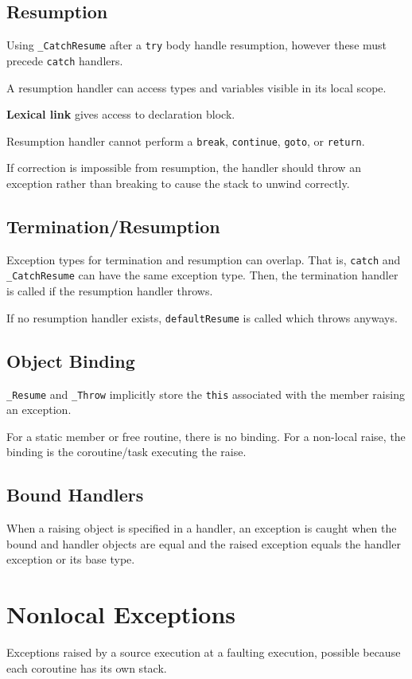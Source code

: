 \documentclass[11pt]{article}
\begin{document}
\subsection{Resumption}
\label{sec:org9e1e2b3}
Using \texttt{\_CatchResume} after a \texttt{try} body handle resumption, however these must precede \texttt{catch} handlers.

A resumption handler can access types and variables visible in its local scope.

\textbf{Lexical link} gives access to declaration block.

Resumption handler cannot perform a \texttt{break}, \texttt{continue}, \texttt{goto}, or \texttt{return}.

If correction is impossible from resumption, the handler should throw an exception rather than
breaking to cause the stack to unwind correctly.
\subsection{Termination/Resumption}
\label{sec:org0ec686c}
Exception types for termination and resumption can overlap.
That is, \texttt{catch} and \texttt{\_CatchResume} can have the same exception type.
Then, the termination handler is called if the resumption handler throws.

If no resumption handler exists, \texttt{defaultResume} is called which throws anyways.
\subsection{Object Binding}
\label{sec:org985291a}
\texttt{\_Resume} and \texttt{\_Throw} implicitly store the \texttt{this} associated with the member raising an exception.

For a static member or free routine, there is no binding.
For a non-local raise, the binding is the coroutine/task executing the raise.
\subsection{Bound Handlers}
\label{sec:org62822b0}
When a raising object is specified in a handler, an exception is caught when the bound and handler
objects are equal and the raised exception equals the handler exception or its base type.
\section{Nonlocal Exceptions}
\label{sec:org38719ca}
Exceptions raised by a source execution at a faulting execution, possible because each coroutine has
its own stack.
\end{document}

